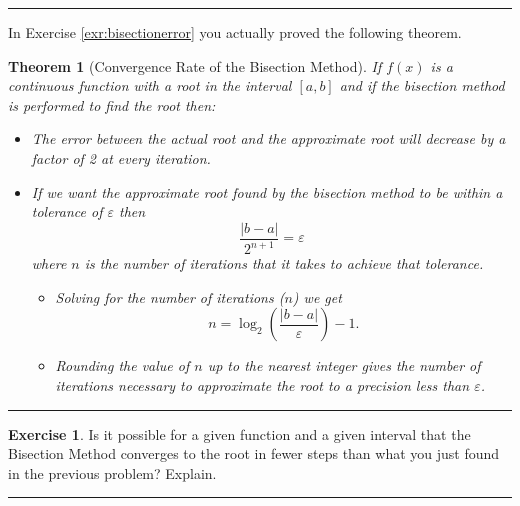 \documentclass[
]{book}
\providecommand{\tightlist}{%
  \setlength{\itemsep}{0pt}\setlength{\parskip}{0pt}}
\newtheorem{theorem}{Theorem}[chapter]
\theoremstyle{definition}
\theoremstyle{definition}
\theoremstyle{definition}
\newtheorem{exercise}{Exercise}[chapter]
\theoremstyle{remark}
\begin{document}
\begin{center}\rule{0.5\linewidth}{0.5pt}\end{center}

In Exercise \ref{exr:bisectionerror} you actually proved the following theorem.

\begin{theorem}[Convergence Rate of the Bisection Method]
\protect\hypertarget{thm:bisectionconvergence}{}{\label{thm:bisectionconvergence} {} }If \(f(x)\) is a continuous function with a root in the interval \([a,b]\) and if the bisection method is performed to find the root then:

\begin{itemize}
\tightlist
\item
  The error between the actual root and the approximate root will decrease by a factor of 2 at every iteration.
\item
  If we want the approximate root found by the bisection method to be within a tolerance of \(\varepsilon\) then
  \[ \frac{|b-a|}{2^{n+1}} = \varepsilon \]
  where \(n\) is the number of iterations that it takes to achieve that tolerance.

  \begin{itemize}
  \tightlist
  \item
    Solving for the number of iterations (\(n\)) we get
    \[ n = \log_2\left( \frac{|b-a|}{\varepsilon} \right) - 1. \]
  \item
    Rounding the value of \(n\) up to the nearest integer gives the number of iterations necessary to approximate the root to a precision less than \(\varepsilon\).
  \end{itemize}
\end{itemize}
\end{theorem}

\begin{center}\rule{0.5\linewidth}{0.5pt}\end{center}

\begin{exercise}
\protect\hypertarget{exr:unnamed-chunk-87}{}{\label{exr:unnamed-chunk-87} }Is it possible for a given function and a given interval that the
Bisection Method converges to the root in fewer steps than what you just
found in the previous problem? Explain.
\end{exercise}

\begin{center}\rule{0.5\linewidth}{0.5pt}\end{center}
\end{document}
